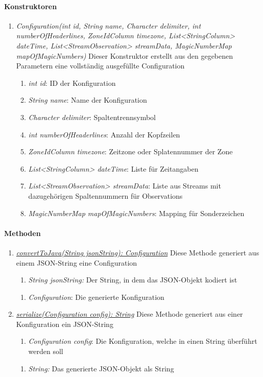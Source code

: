 \paragraph{Konstruktoren}
\begin{enumerate}[+]
	\item \textit{Configuration(int id, String name, Character delimiter, int numberOfHeaderlines, ZoneIdColumn timezone, List<StringColumn> dateTime, List<StreamObservation> streamData, MagicNumberMap mapOfMagicNumbers)} Dieser Konstruktor erstellt aus den gegebenen Parametern eine vollständig ausgefüllte Configuration
	\begin{enumerate}[$\bullet$]
		\item \textit{int id}: ID der Konfiguration
		\item \textit{String name}: Name der Konfiguration
		\item \textit{Character delimiter}: Spaltentrennsymbol
		\item \textit{int numberOfHeaderlines}: Anzahl der Kopfzeilen
		\item \textit{ZoneIdColumn timezone}: Zeitzone oder Splatennummer der Zone
		\item \textit{List<StringColumn> dateTime}: Liste für Zeitangaben
		\item \textit{List<StreamObservation> streamData}: Liste aus Streams mit dazugehörigen Spaltennummern für Observations
		\item \textit{MagicNumberMap mapOfMagicNumbers}: Mapping für Sonderzeichen
	\end{enumerate}
\end{enumerate}

\paragraph{Methoden}
\begin{enumerate}[+]
	\item \textit{\underline{convertToJava(String jsonString): Configuration}} Diese Methode generiert aus einem JSON-String eine Configuration
	\begin{enumerate}[$\bullet$]
		\item \textit{String jsonString:} Der String, in dem das JSON-Objekt kodiert ist
	\end{enumerate}
	\begin{enumerate}[$\circ$]
		\item \textit{Configuration}: Die generierte Konfiguration
	\end{enumerate}
	
	\item \textit{\underline{serialize(Configuration config): String}} Diese Methode generiert aus einer Konfiguration ein JSON-String
	\begin{enumerate}[$\bullet$]
		\item \textit{Configuration config}: Die Konfiguration, welche in einen String überführt werden soll
	\end{enumerate}
	\begin{enumerate}[$\circ$]
		\item \textit{String:} Das generierte JSON-Objekt als String
	\end{enumerate}
\end{enumerate}
